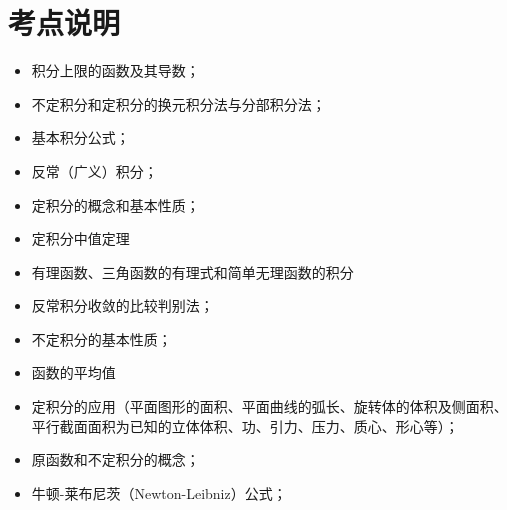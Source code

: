 \section{考点说明}
\begin{itemize}
\item 积分上限的函数及其导数；
\item 不定积分和定积分的换元积分法与分部积分法；
\item 基本积分公式；
\item 反常（广义）积分；
\item 定积分的概念和基本性质；
\item 定积分中值定理
\item 有理函数、三角函数的有理式和简单无理函数的积分
\item 反常积分收敛的比较判别法；
\item 不定积分的基本性质；
\item 函数的平均值
\item 定积分的应用（平面图形的面积、平面曲线的弧长、旋转体的体积及侧面积、平行截面面积为已知的立体体积、功、引力、压力、质心、形心等）；
\item 原函数和不定积分的概念；
\item 牛顿-莱布尼茨（Newton-Leibniz）公式；
\end{itemize}

